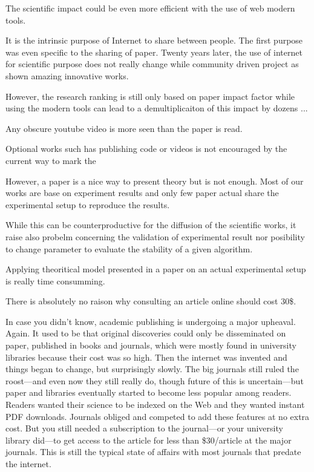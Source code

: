 The scientific impact could be even more efficient with the use of web modern tools.

It is the intrinsic purpose of Internet to share between people. The first purpose was even specific to the sharing of paper. Twenty years later, the use of internet for scientific purpose does not really change while community driven project as shown amazing innovative works.

However, the research ranking is still only based on paper impact factor while using the modern tools can lead to a demultiplicaiton of this impact by dozens ...

Any obscure youtube video is more seen than the paper is read.

Optional works such has publishing code or videos is not encouraged by the current way to mark the

However, a paper is a nice way to present theory but is not enough. Most of our works are base on experiment results and only few paper actual share the experimental setup to reproduce the results.

While this can be counterproductive for the diffusion of the scientific works, it raise also probelm concerning the validation of experimental result nor posibility to change parameter to evaluate the stability of a given algorithm.

Applying theoritical model presented in a paper on an actual experimental setup is really time consumming.

There is absolutely no raison why consulting an article online should cost 30\$.

In case you didn’t know, academic publishing is undergoing a major upheaval. Again. It used to be that original discoveries could only be disseminated on paper, published in books and journals, which were mostly found in university libraries because their cost was so high. Then the internet was invented and things began to change, but surprisingly slowly. The big journals still ruled the roost—and even now they still really do, though future of this is uncertain—but paper and libraries eventually started to become less popular among readers. Readers wanted their science to be indexed on the Web and they wanted instant PDF downloads. Journals obliged and competed to add these features at no extra cost. But you still needed a subscription to the journal—or your university library did—to get access to the article for less than \$30/article at the major journals. This is still the typical state of affairs with most journals that predate the internet.

